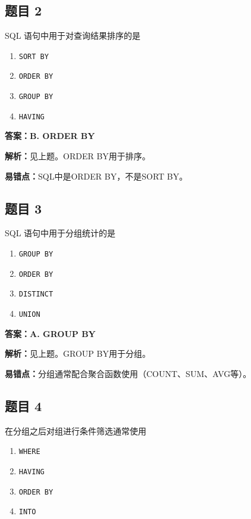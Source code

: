 \documentclass[12pt,a4paper]{ctexart}
\begin{document}
\subsection*{题目 2}
SQL 语句中用于对查询结果排序的是
\begin{enumerate}[label=\Alph*.]
	\item \texttt{SORT BY}
	\item \texttt{ORDER BY}
	\item \texttt{GROUP BY}
	\item \texttt{HAVING}
\end{enumerate}

\begin{answerbox}
	\textbf{答案：B. ORDER BY}

	\textbf{解析：}见上题。ORDER BY用于排序。

	\textbf{易错点：}SQL中是ORDER BY，不是SORT BY。
\end{answerbox}

\subsection*{题目 3}
SQL 语句中用于分组统计的是
\begin{enumerate}[label=\Alph*.]
	\item \texttt{GROUP BY}
	\item \texttt{ORDER BY}
	\item \texttt{DISTINCT}
	\item \texttt{UNION}
\end{enumerate}

\begin{answerbox}
	\textbf{答案：A. GROUP BY}

	\textbf{解析：}见上题。GROUP BY用于分组。

	\textbf{易错点：}分组通常配合聚合函数使用（COUNT、SUM、AVG等）。
\end{answerbox}

\subsection*{题目 4}
在分组之后对组进行条件筛选通常使用
\begin{enumerate}[label=\Alph*.]
	\item \texttt{WHERE}
	\item \texttt{HAVING}
	\item \texttt{ORDER BY}
	\item \texttt{INTO}
\end{enumerate}
\end{document}
